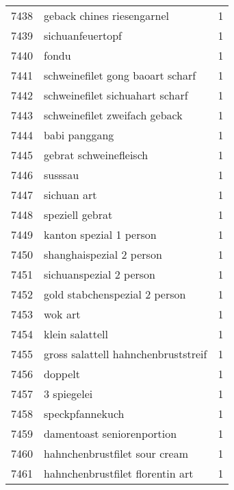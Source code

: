\begin{tabular}{llr}
7438 &                         geback chines riesengarnel &      1 \\
7439 &                                   sichuanfeuertopf &      1 \\
7440 &                                              fondu &      1 \\
7441 &                   schweinefilet gong baoart scharf &      1 \\
7442 &                    schweinefilet sichuahart scharf &      1 \\
7443 &                      schweinefilet zweifach geback &      1 \\
7444 &                                      babi panggang &      1 \\
7445 &                             gebrat schweinefleisch &      1 \\
7446 &                                            susssau &      1 \\
7447 &                                        sichuan art &      1 \\
7448 &                                    speziell gebrat &      1 \\
7449 &                            kanton spezial 1 person &      1 \\
7450 &                           shanghaispezial 2 person &      1 \\
7451 &                            sichuanspezial 2 person &      1 \\
7452 &                      gold stabchenspezial 2 person &      1 \\
7453 &                                            wok art &      1 \\
7454 &                                    klein salattell &      1 \\
7455 &                gross salattell hahnchenbruststreif &      1 \\
7456 &                                            doppelt &      1 \\
7457 &                                        3 spiegelei &      1 \\
7458 &                                    speckpfannekuch &      1 \\
7459 &                         damentoast seniorenportion &      1 \\
7460 &                      hahnchenbrustfilet sour cream &      1 \\
7461 &                   hahnchenbrustfilet florentin art &      1 \\

\end{tabular}

